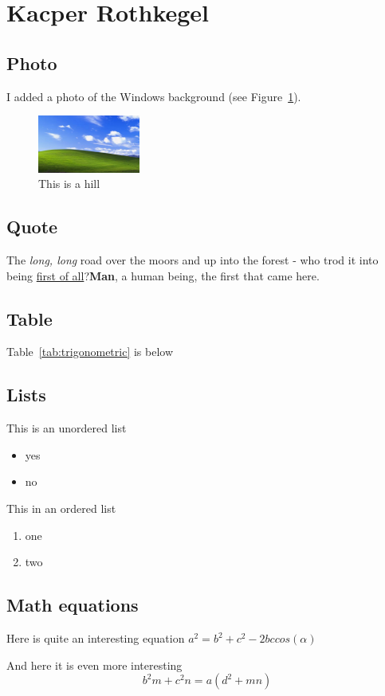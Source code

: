 \newpage
\section{Kacper Rothkegel}

\subsection{Photo}
I added a photo of the Windows background (see Figure~\ref{fig:bg}).

\begin{figure}[htbp]
    \centering
    \includegraphics[width=0.3\textwidth]{pictures/tapeta.jpeg}
    \caption{This is a hill}
    \label{fig:bg}
\end{figure}

\subsection{Quote}
\begin{flushright}
The \emph{long, long} road over the moors and up into the forest - who trod it into being \underline{first of all}?\textbf{Man}, a human being, the first that came here.
\end{flushright}

\subsection{Table}
Table~\ref{tab:trigonometric} is below


\subsection{Lists}
This is an unordered list
\begin{itemize}
  \item yes
  \item no
\end{itemize}

This in an ordered list
\begin{enumerate}
  \item one
  \item two
\end{enumerate}

\subsection{Math equations}
Here is quite an interesting equation
$ a^2 = b^2 + c^2 -2bccos(\alpha)  $

And here it is even more interesting
\[b^2m + c^2n = a(d^2 + mn)\]

